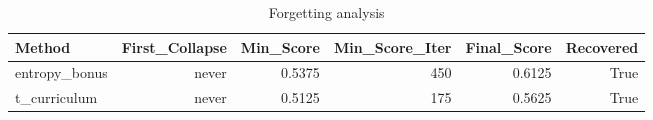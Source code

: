 \begin{table}[htbp]
\centering
\caption{Forgetting analysis}
\label{tab:forgetting}
\begin{tabular}{lrrrrr}
\toprule
\textbf{Method} & \textbf{First\_Collapse} & \textbf{Min\_Score} & \textbf{Min\_Score\_Iter} & \textbf{Final\_Score} & \textbf{Recovered} \\
\midrule
entropy\_bonus & never & 0.5375 & 450 & 0.6125 & True \\
t\_curriculum & never & 0.5125 & 175 & 0.5625 & True \\
\bottomrule
\end{tabular}
\end{table}